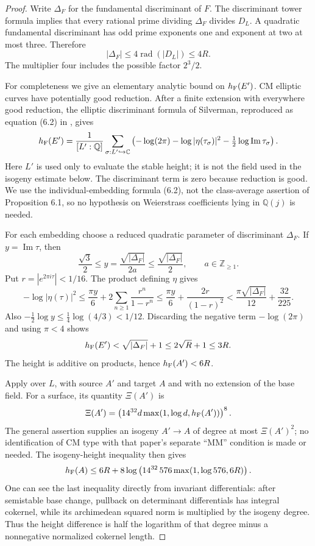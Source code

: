 \begin{proof}
Write $\Delta_F$ for the fundamental discriminant of $F$. The
discriminant tower formula implies that every rational prime dividing
$\Delta_F$ divides $D_L$. A quadratic fundamental discriminant has
odd prime exponents one and exponent at two at most three. Therefore
\[
 |\Delta_F|\le4\operatorname{rad}(|D_L|)\le4R.
\]
The multiplier four includes the possible factor $2^3/2$.

For completeness we give an elementary analytic bound on $h_{\rm F}(E')$.
CM elliptic curves have potentially good reduction. After a finite
extension with everywhere good reduction, the elliptic discriminant
formula of Silverman, reproduced as equation (6.2) in
\cite{cmheight}, gives
\[
 h_{\rm F}(E')=\frac1{[L':\mathbb Q]}\sum_{\sigma:L'\hookrightarrow\mathbb C}
 \left(-\log(2\pi)-\log|\eta(\tau_\sigma)|^2
                     -\tfrac12\log\operatorname{Im}\tau_\sigma\right).
\]
Here $L'$ is used only to evaluate the stable height; it is not the
field used in the isogeny estimate below. The discriminant term is zero
because reduction is good. We use the individual-embedding formula
(6.2), not the class-average assertion of Proposition 6.1, so no
hypothesis on Weierstrass coefficients lying in $\mathbb Q(j)$ is needed.

For each embedding choose a reduced quadratic parameter of discriminant
$\Delta_F$. If $y=\operatorname{Im}\tau$, then
\[
 \frac{\sqrt3}{2}\le y=\frac{\sqrt{|\Delta_F|}}{2a}
                   \le\frac{\sqrt{|\Delta_F|}}2,
 \qquad a\in\mathbb Z_{\ge1}.
\]
Put $r=|e^{2\pi i\tau}|<1/16$. The product defining $\eta$ gives
\[
 -\log|\eta(\tau)|^2
 \le\frac{\pi y}{6}+2\sum_{n\ge1}\frac{r^n}{1-r^n}
 \le\frac{\pi y}{6}+\frac{2r}{(1-r)^2}
 <\frac{\pi\sqrt{|\Delta_F|}}{12}+\frac{32}{225}.
\]
Also $-\tfrac12\log y\le\tfrac14\log(4/3)<1/12$.
Discarding the negative term $-\log(2\pi)$ and using $\pi<4$ shows
\[
 h_{\rm F}(E')<\sqrt{|\Delta_F|}+1\le2\sqrt R+1\le3R.
\]
The height is additive on products, hence $h_{\rm F}(A')<6R$.

Apply \cite[Theorem 1.9(1)]{GaudronRemond2023} over $L$, with source
$A'$ and target $A$ and with no extension of the base field.
For a surface, its quantity $\Xi(A')$ is
\[
 \Xi(A')=\left(14^{32}d\max(1,\log d,h_{\rm F}(A'))\right)^8.
\]
The general assertion supplies an isogeny $A'\to A$ of degree at most
$\Xi(A')^2$; no identification of CM type with that paper's
separate ``MM'' condition is made or needed. The isogeny-height
inequality then gives
\[
 h_{\rm F}(A)\le6R+
 8\log\left(14^{32}\,576\max(1,\log576,6R)\right).
\]
One can see the last inequality directly from invariant differentials:
after semistable base change, pullback on determinant differentials has
integral cokernel, while its archimedean squared norm is multiplied by
the isogeny degree. Thus the height difference is half the logarithm
of that degree minus a nonnegative normalized cokernel length.


\end{proof}
